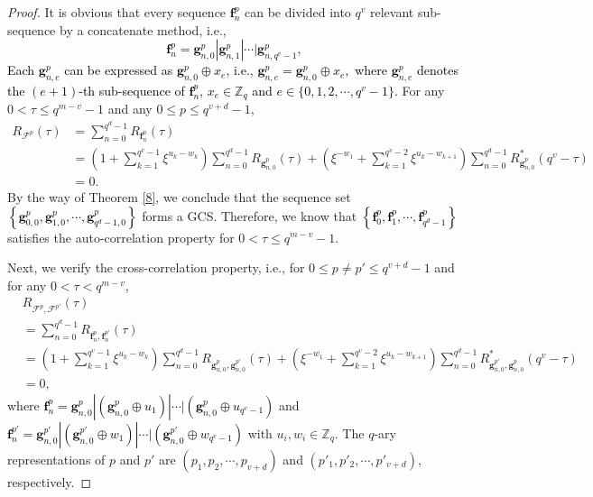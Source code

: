 \documentclass[11pt]{article}
\newcommand{\2} {$2$-to-$1$}
\begin{document}
\begin{proof}
	It is obvious that every sequence \textcolor{black}{$\mathbf{f}^{p}_{n}$} can be divided into $q^{v}$ relevant sub-sequence by a concatenate method, i.e.,
	\textcolor{black}{$$\mathbf{f}^{p}_{n}=\mathbf{g}^{p}_{n,0}|\mathbf{g}^{p}_{n,1}|\cdots|\mathbf{g}^{p}_{n,q^{v}-1},$$ }
	\textcolor{black}{Each $\mathbf{g}^{p}_{n,e}$ can be expressed as $\mathbf{g}^{p}_{n,0}\oplus x_e$, i.e., $\mathbf{g}^{p}_{n,e}=\mathbf{g}^{p}_{n,0}\oplus x_e,$ where $ \mathbf{g}^{p}_{n,e} $ denotes the $ (e+1) $-th sub-sequence of $ \mathbf{f}^{p}_{n} $, $x_e\in \mathbb{Z}_{q}$  and $e\in\{0,1,2,\cdots,q^{v}-1\}.$}  For
	any $0<\tau\leq q^{m-v}-1$ and any $0\leq p\leq q^{v+d}-1$,
	\begin{align*}
		R_{\mathcal{F}^p}(\tau) &=\sum^{q^{d}-1}_{n=0}R_{\mathbf{f}^p_{n}}(\tau)\\
		&=\left(1+\sum^{q^{v}-1}_{k=1}\xi^{u_{k}-w_{k}}\right)\sum^{q^{d}-1}_{n=0}R_{\mathbf{g}^p_{n,0}}(\tau)+
		\left(\xi^{-w_{1}}+\sum^{q^{v}-2}_{k=1}\xi^{u_{k}-w_{k+1}}\right)\sum^{q^{d}-1}_{n=0}R^{*}_{\mathbf{g}^p_{n,0}}(q^{v}-\tau)\\
		&=0.
	\end{align*}
	By the way of Theorem \ref{8}, we conclude that the sequence set \textcolor{black}{$\left\lbrace \mathbf{g}^{p}_{0,0},\mathbf{g}^{p}_{1,0},\cdots,\mathbf{g}^{p}_{q^{d}-1,0}\right\rbrace $} forms a GCS. Therefore, we know that  \textcolor{black}{$\left\lbrace \mathbf{f}^{p}_{0},\mathbf{f}^{p}_{1},\cdots,\mathbf{f}^{p}_{q^d-1}\right\rbrace $} satisfies the auto-correlation property for $0<\tau\leq q^{m-v}-1$.
	
	Next, we verify the cross-correlation property, i.e., for $0\leq p\neq p'\leq q^{v+d}-1$ and for any $ 0<\tau<q^{m-v} $,
	\begin{align*}
		&R_{\mathcal{F}^{p},\mathcal{F}^{p'}}(\tau)\\ &=\sum^{q^{d}-1}_{n=0}R_{\mathbf{f}^{p}_{n},\mathbf{f}^{p'}_{n}}(\tau)\\
		&=\left(1+\sum^{q^{v}-1}_{k=1}\xi^{u_{k}-w_{k}}\right)\sum^{q^{d}-1}_{n=0}R_{\mathbf{g}^{p}_{n,0},\mathbf{g}^{p'}_{n,0}}(\tau)+
		\left(\xi^{-w_{1}}+\sum^{q^{v}-2}_{k=1}\xi^{u_{k}-w_{k+1}}\right)\sum^{q^{d}-1}_{n=0}R^{*}_{\mathbf{g}^{p'}_{n,0},\mathbf{g}^{p}_{n,0}}(q^{v}-\tau)\\
		&=0,
	\end{align*}
	where \textcolor{black}{$\mathbf{f}^{p}_{n}=\mathbf{g}^{p}_{n,0}|(\mathbf{g}^{p}_{n,0}\oplus u_{1})|\cdots|(\mathbf{g}^{p}_{n,0}\oplus u_{q^{v}-1})$} and \textcolor{black}{$\mathbf{f}^{p'}_{n}=\mathbf{g}^{p'}_{n,0}|(\mathbf{g}^{p'}_{n,0}\oplus w_{1})|\cdots|(\mathbf{g}^{p'}_{n,0}\oplus w_{q^{v}-1})$} with $u_{i}, w_{i}\in \mathbb{Z}_{q}.$ The $q$-ary representations of $p$ and $p'$ are $(p_{1},p_{2},\cdots,p_{v+d})$ and $(p'_{1},p'_{2},\cdots,p'_{v+d})$, respectively.
	

\end{proof}
\end{document}
